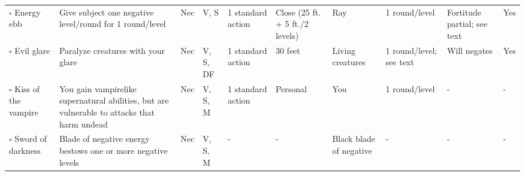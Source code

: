\documentclass[12pt, a4paper]{article}
\begin{document}
\begin{center}
\begin{longtable}[H]{ p{8em} p{15em} p{2em} p{5em} p{6em} p{6em} p{10em} p{6em} p{5em} p{2em} }
    \(\square\) Energy ebb & Give subject one negative level/round for 1 round/level & Nec & V, S & 1 standard action & Close (25 ft. + 5 ft./2 levels) & Ray & 1 round/level & Fortitude partial; see text & Yes\\
    \(\square\) Evil glare & Paralyze creatures with your glare & Nec & V, S, DF & 1 standard action & 30 feet & Living creatures & 1 round/level; see text & Will negates & Yes\\
    \(\square\) Kiss of the vampire & You gain vampirelike supernatural abilities, but are vulnerable to attacks that harm undead & Nec & V, S, M & 1 standard action & Personal & You & 1 round/level & - & -\\
    \(\square\) Sword of darkness & Blade of negative energy bestows one or more negative levels & Nec & V, S, M & - & - & Black blade of negative  & - & - & -\\
  \end{longtable}


\end{center}
\end{document}
